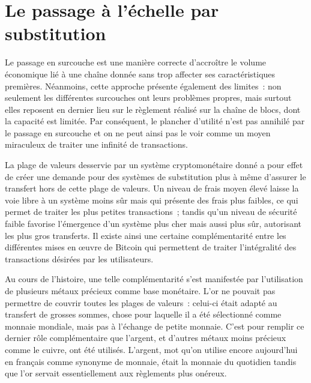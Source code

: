
\section*{Le passage à l'échelle par substitution}

Le passage en surcouche est une manière correcte d'accroître le volume économique lié à une chaîne donnée sans trop affecter ses caractéristiques premières. Néanmoins, cette approche présente également des limites~: non seulement les différentes surcouches ont leurs problèmes propres, mais surtout elles reposent en dernier lieu sur le règlement réalisé sur la chaîne de blocs, dont la capacité est limitée. Par conséquent, le plancher d'utilité n'est pas annihilé par le passage en surcouche et on ne peut ainsi pas le voir comme un moyen miraculeux de traiter une infinité de transactions.

La plage de valeurs desservie par un système cryptomonétaire donné a pour effet de créer une demande pour des systèmes de substitution plus à même d'assurer le transfert hors de cette plage de valeurs. Un niveau de frais moyen élevé laisse la voie libre à un système moins sûr mais qui présente des frais plus faibles, ce qui permet de traiter les plus petites transactions~; tandis qu'un niveau de sécurité faible favorise l'émergence d'un système plus cher mais aussi plus sûr, autorisant les plus gros transferts. Il existe ainsi une certaine complémentarité entre les différentes mises en œuvre de Bitcoin qui permettent de traiter l'intégralité des transactions désirées par les utilisateurs.

Au cours de l'histoire, une telle complémentarité s'est manifestée par l'utilisation de plusieurs métaux précieux comme base monétaire. L'or ne pouvait pas permettre de couvrir toutes les plages de valeurs~: celui-ci était adapté au transfert de grosses sommes, chose pour laquelle il a été sélectionné comme monnaie mondiale, mais pas à l'échange de petite monnaie. C'est pour remplir ce dernier rôle complémentaire que l'argent, et d'autres métaux moins précieux comme le cuivre, ont été utilisés. L'argent, mot qu'on utilise encore aujourd'hui en français comme synonyme de monnaie, était la monnaie du quotidien tandis que l'or servait essentiellement aux règlements plus onéreux.

